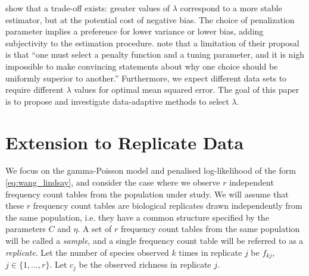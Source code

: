 \documentclass[oupdraft]{bio}
\begin{document}
\citet{wang_2005} show that a trade-off exists: greater values of $\lambda$ correspond to a more stable estimator, but at the potential cost of negative bias.
The choice of penalization parameter implies a preference for lower variance or lower bias, adding subjectivity to the estimation procedure.
\citet{wang_2005} note that a limitation of their proposal is that ``one must select a penalty function and a tuning parameter, and it is nigh impossible to make convincing statements about why one choice should be uniformly superior to another.''
Furthermore, we expect different data sets to require different $\lambda$ values for optimal mean squared error.
The goal of this paper is to propose and investigate data-adaptive methods to select $\lambda$.


\section{Extension to Replicate Data}
\label{sec:fixed_lambda}

We focus on the gamma-Poisson model and penalised log-likelihood of the form \eqref{eq:wang_lindsay}, and consider the case where we observe $r$ independent frequency count tables from the population under study.
We will assume that these $r$ frequency count tables are biological replicates drawn independently from the same population, i.e. they have a common structure specified by the parameters $C$ and $\eta$.  A set of $r$ frequency count tables from the same population will be called a \textit{sample}, and a single frequency count table will be referred to as a \textit{replicate}.  Let the number of species observed $k$ times in replicate $j$ be $f_{kj}$, $j \in \{1, \dots , r\}$.  Let $c_j$ be the observed richness in replicate $j$.

\end{document}
